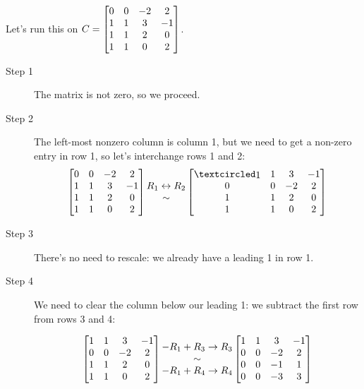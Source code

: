\begin{myexample} 

Let's run this on $C=
\left[ \begin{matrix} 0 & 0 & -2 & 2 \\
 1 & 1 & 3 & -1 \\
 1 & 1 & 2 & 0 \\
 1 & 1 & 0 & 2 \end{matrix} \right]$.

\begin{description}
\item[Step 1] The matrix is not zero, so we proceed.
\item[Step 2] The left-most nonzero column is column 1, but we need to get a non-zero entry in row 1, so let's interchange rows 1 and 2:
$$\mat{0 & 0 & -2 & 2 \\
 1 & 1 & 3 & -1 \\
 1 & 1 & 2 & 0 \\
 1 & 1 & 0 & 2} 
\begin{matrix} R_1\leftrightarrow R_2\\ \sim  \end{matrix} 
\mat{ \pivot & 1 & 3 & -1\\ 
0 & 0 & -2 & 2 \\
 1 & 1 & 2 & 0 \\
 1 & 1 & 0 & 2}$$
\item[Step 3] There's no need to rescale: we already have a leading 1 in row 1.
\item[Step 4] We need to clear the column  below our leading 1: we subtract the first row from rows 3 and 4:

$$\left[ \begin{matrix}  1 & 1 & 3 & -1\\ 
0 & 0 & -2 & 2 \\
 1 & 1 & 2 & 0 \\
 1 & 1 & 0 & 2 \end{matrix} \right]
\begin{matrix} -R_1+R_3\to R_3 \\ \sim \\-R_1+R_4\to R_4 \end{matrix} 
\left[ \begin{matrix}  
1 & 1 & 3 & -1\\ 
0 & 0 & -2 & 2 \\
0 & 0 & -1 & 1 \\
0 & 0 & -3 & 3 \end{matrix} \right]$$


\end{description}
\end{myexample}
